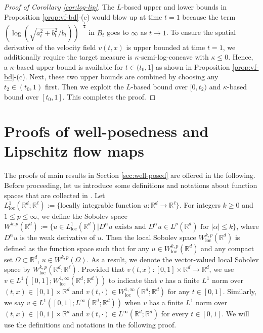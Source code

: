 \documentclass[twoside,11pt]{article}
\def\sR{{\mathbb{R}}}
\numberwithin{equation}{section}
\begin{document}
\begin{proof} [Proof of Corollary \ref{cor:log-lip}]
    The $L$-based upper and lower bounds in Proposition \ref{prop:vf-bd}-(e) would blow up at time $t = 1$ because the term $(\log (\sqrt{a_t^2 + b_t^2}/b_t))^{-\frac12}$ in $B_t$ goes to $\infty$ as $t \to 1$.
    To ensure the spatial derivative of the velocity field $v(t, x)$ is upper bounded at time $t = 1$, we additionally require the target measure is $\kappa$-semi-log-concave with $\kappa \le 0$.
    Hence, a $\kappa$-based upper bound is available for $t \in (t_0, 1]$ as shown in Proposition \ref{prop:vf-bd}-(c).
    Next, these two upper bounds are combined by choosing any $t_2 \in (t_0, 1)$ first.
    Then we exploit the $L$-based bound over $[0, t_2)$ and $\kappa$-based bound over $[t_0, 1]$.
    This completes the proof.
\end{proof}






\section{Proofs of well-posedness and Lipschitz flow maps}

The proofs of main results in Section \ref{sec:well-posed} are offered in the following.
Before proceeding, let us introduce some definitions and notations about function spaces that are collected in \cite[Chapter 5]{evans2010partial}.
Let $L_{\mathrm{loc}}^1(\sR^d; \sR^{\ell}) := \{ \textrm{locally integrable function } u:\sR^d \to \sR^{\ell} \}$.
For integers $k \ge 0$ and $1 \le p \le \infty$, we define the Sobolev space $W^{k, p}(\sR^d):= \{ u \in L^1_{\mathrm{loc}} (\sR^d) \vert D^{\alpha}u \textrm{ exists and } D^{\alpha}u \in L^p(\sR^d) \textrm{ for } \vert \alpha \vert \le k \}$, where $D^{\alpha}u$ is the weak derivative of $u$.
Then the local Sobolev space $W_{\mathrm{loc}}^{k, p}(\sR^d)$ is defined as the function space such that for any $u \in W_{\mathrm{loc}}^{k, p}(\sR^d)$ and any compact set $\Omega \subset \sR^d$, $u \in W^{k, p}(\Omega)$.
As a result, we denote the vector-valued local Sobolev space by $W_{\mathrm{loc}}^{k, p}(\sR^d; \sR^{\ell})$.
Provided that $v(t, x): [0, 1] \times \sR^d \to \sR^d$, we use $v \in L^1([0, 1]; W^{1, \infty}_{\mathrm{loc}}(\sR^d; \sR^d))$ to indicate that $v$ has a finite $L^1$ norm over $(t, x) \in [0, 1] \times \sR^d$ and $v(t, \cdot) \in W^{1, \infty}_{\mathrm{loc}}(\sR^d; \sR^d)$ for any $t \in [0, 1]$.
Similarly, we say $v \in L^1([0, 1]; L^{\infty}(\sR^d; \sR^d))$ when $v$ has a finite $L^1$ norm over $(t, x) \in [0, 1] \times \sR^d$ and $v(t, \cdot) \in L^{\infty}(\sR^d; \sR^d)$ for every $t \in [0, 1]$. We will use the definitions and notations in the following proof.
\end{document}
